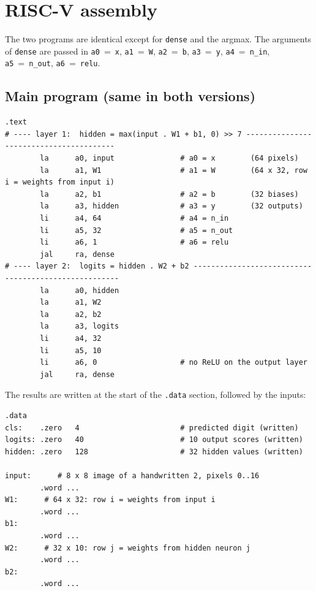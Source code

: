\documentclass[11pt,a4paper]{article}
\newcommand{\code}[1]{\texttt{#1}}
\begin{document}
\section{RISC-V assembly}

The two programs are identical except for \code{dense} and the argmax. The arguments of
\code{dense} are passed in \code{a0}~=~\code{x}, \code{a1}~=~\code{W}, \code{a2}~=~\code{b},
\code{a3}~=~\code{y}, \code{a4}~=~\code{n\_in}, \code{a5}~=~\code{n\_out}, \code{a6}~=~\code{relu}.

\subsection{Main program (same in both versions)}

\begin{lstlisting}[style=asm]
        .text
# ---- layer 1:  hidden = max(input . W1 + b1, 0) >> 7 ----------------------------------------
        la      a0, input               # a0 = x        (64 pixels)
        la      a1, W1                  # a1 = W        (64 x 32, row i = weights from input i)
        la      a2, b1                  # a2 = b        (32 biases)
        la      a3, hidden              # a3 = y        (32 outputs)
        li      a4, 64                  # a4 = n_in
        li      a5, 32                  # a5 = n_out
        li      a6, 1                   # a6 = relu
        jal     ra, dense
# ---- layer 2:  logits = hidden . W2 + b2 -----------------------------------------------------
        la      a0, hidden
        la      a1, W2
        la      a2, b2
        la      a3, logits
        li      a4, 32
        li      a5, 10
        li      a6, 0                   # no ReLU on the output layer
        jal     ra, dense
\end{lstlisting}

The results are written at the start of the \code{.data} section, followed by the inputs:
\begin{lstlisting}[style=asm]
        .data
cls:    .zero   4                       # predicted digit (written)
logits: .zero   40                      # 10 output scores (written)
hidden: .zero   128                     # 32 hidden values (written)

input:      # 8 x 8 image of a handwritten 2, pixels 0..16
        .word ...
W1:      # 64 x 32: row i = weights from input i
        .word ...
b1:
        .word ...
W2:      # 32 x 10: row j = weights from hidden neuron j
        .word ...
b2:
        .word ...
\end{lstlisting}
\end{document}
